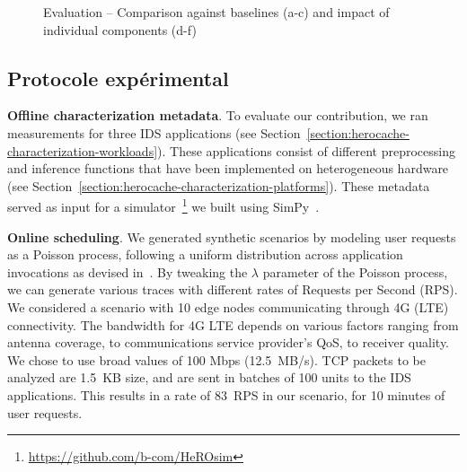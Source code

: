 \begin{figure}[t]
{    }
    \caption{Evaluation -- Comparison against baselines (a-c) and impact of individual components (d-f)}
    \label{figure:herocache-evaluation}
\end{figure}

\subsection{Protocole expérimental}


\textbf{Offline characterization metadata}. To evaluate our contribution, we ran measurements for three IDS applications (see Section~\ref{section:herocache-characterization-workloads}). These applications consist of different preprocessing and inference functions that have been implemented on heterogeneous hardware (see Section~\ref{section:herocache-characterization-platforms}). These metadata served as input for a simulator~\footnote{\href{https://github.com/b-com/HeROsim}{https://github.com/b-com/HeROsim}} we built using SimPy~\cite{simpy}.

\textbf{Online scheduling}.
We generated synthetic scenarios by modeling user requests as a Poisson process, following a uniform distribution across application invocations as devised in~\cite{9928755}. By tweaking the $\lambda$ parameter of the Poisson process, we can generate various traces with different rates of Requests per Second (RPS). We considered a scenario with 10 edge nodes communicating through 4G (LTE) connectivity. The bandwidth for 4G LTE depends on various factors ranging from antenna coverage, to communications service provider's QoS, to receiver quality. We chose to use broad values of 100 Mbps (12.5~MB/s). TCP packets to be analyzed are 1.5~KB size, and are sent in batches of 100 units to the IDS applications. This results in a rate of 83~RPS in our scenario, for 10 minutes of user requests. 

